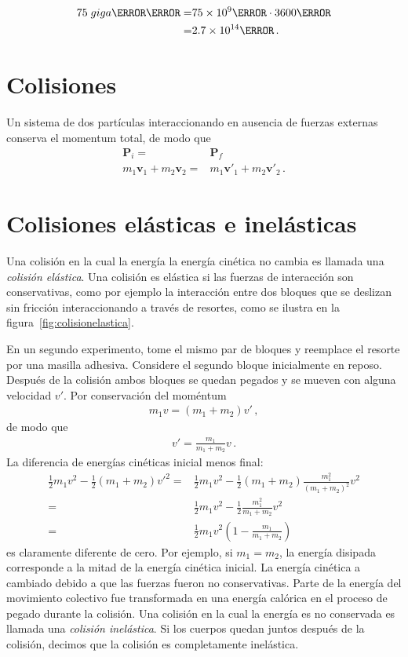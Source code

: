\begin{align*}
  75\;giga\watt\hour=&75\times 10^9\watt\cdot 3600\second\nonumber\\
  =&2.7\times 10^{14}\joule\,.
\end{align*}



\section{Colisiones}
Un sistema de dos partículas interaccionando en ausencia de fuerzas externas conserva el momentum total, de modo que
\begin{align}
  \mathbf{P}_i=&\mathbf{P}_f\nonumber\\
m_1\mathbf{v}_1+m_2\mathbf{v}_2=&m_1\mathbf{v}'_1+m_2\mathbf{v}'_2\,.
\end{align}


\section{Colisiones elásticas e inelásticas}
Una colisión en la cual la energía la energía cinética no cambia 
es llamada una \emph{colisión elástica}. Una colisión es elástica si
las fuerzas de interacción son conservativas, como por ejemplo la
interacción entre dos bloques que se deslizan sin fricción
interaccionando a través de resortes, como se ilustra en la
figura~\ref{fig:colisionelastica}.

En un segundo experimento, tome el mismo par de bloques y reemplace el
resorte por una masilla adhesiva. Considere el segundo bloque
inicialmente en reposo. Después de la colisión ambos bloques se quedan
pegados y se mueven con alguna velocidad $v'$. Por conservación del
moméntum
\begin{align}
  m_1 v=(m_1+m_2)v'\,,
\end{align}
de modo que
\begin{align}
  v'=\frac{m_1}{m_1+m_2}v\,.
\end{align}
La diferencia de energías cinéticas inicial menos final:
\begin{align}
  \tfrac{1}{2}m_1v^2-\tfrac{1}{2}(m_1+m_2)v'^2=&
  \tfrac{1}{2}m_1v^2-\tfrac{1}{2}(m_1+m_2)\frac{m_1^2}{(m_1+m_2)^2}v^2\nonumber\\
  =&\tfrac{1}{2}m_1v^2-\tfrac{1}{2}\frac{m_1^2}{m_1+m_2}v^2\nonumber\\
  =&\tfrac{1}{2}m_1v^2  \left(1-\frac{m_1}{m_1+m_2} \right)
\end{align}
es claramente diferente de cero. Por ejemplo, si $m_1=m_2$, la energía
disipada corresponde a la mitad de la energía cinética inicial. La
energía cinética a cambiado debido a que las fuerzas fueron no
conservativas. Parte de la energía del movimiento colectivo fue
transformada en una energía calórica en el proceso de pegado durante
la colisión. Una colisión en la cual la energía es no conservada es
llamada una \emph{colisión inelástica}. Si los cuerpos quedan juntos
después de la colisión, decimos que la colisión es completamente
inelástica.

